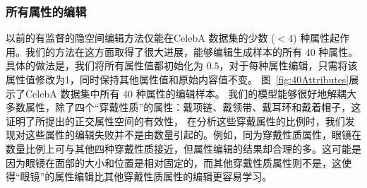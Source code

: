 \subsubsection{所有属性的编辑}
以前的有监督的隐空间编辑方法仅能在CelebA 数据集的少数 ($<$4) 种属性起作用。我们的方法在这方面取得了很大进展，能够编辑生成样本的所有 40 种属性。具体的做法是，我们将所有属性值都初始化为 $0.5$，对于每种属性编辑，只需将该属性值修改为1，同时保持其他属性值和原始内容值不变。 图~\ref{fig:40Attributes}展示了CelebA 数据集中所有 40 种属性的编辑样本。
我们的模型能够很好地解耦大多数属性，除了四个“穿戴性质”的属性：戴项链、戴领带、戴耳环和戴着帽子，这证明了所提出的正交属性空间的有效性，
在分析这些穿戴属性的比例时，我们发现对这些属性的编辑失败并不是由数量引起的。例如，同为穿戴性质属性，眼镜在数量比例上可与其他四种穿戴性质接近，但属性编辑的结果却合理的多。这可能是因为眼镜在面部的大小和位置是相对固定的，而其他穿戴性质属性则不是，这使得“眼镜”的属性编辑比其他穿戴性质属性的编辑更容易学习。

